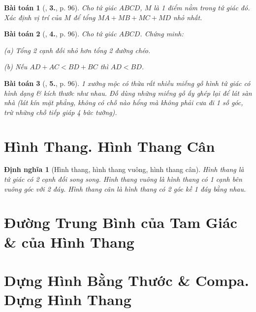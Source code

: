 \documentclass{article}
\numberwithin{equation}{section}
\newtheorem{dinhnghia}{Định nghĩa}[section]
\newtheorem{baitoan}{Bài toán}[section]
\begin{document}
\begin{baitoan}[\cite{Tuyen_Toan_8}, \textbf{3.}, p. 96]
	Cho tứ giác $ABCD$, $M$ là 1 điểm nằm trong tứ giác đó. Xác định vị trí của $M$ để tổng $MA + MB + MC + MD$ nhỏ nhất.
\end{baitoan}

\begin{baitoan}[\cite{Tuyen_Toan_8}, \textbf{4.}, p. 96]
	Cho tứ giác $ABCD$. Chứng minh:
	\begin{enumerate*}
		\item[(a)] Tổng 2 cạnh đối nhỏ hơn tổng 2 đường chéo.
		\item[(b)] Nếu $AD + AC < BD + BC$ thì $AD < BD$.
	\end{enumerate*}
\end{baitoan}

\begin{baitoan}[\cite{Tuyen_Toan_8}, \textbf{5.}, p. 96]
	1 xưởng mộc có thừa rất nhiều miếng gỗ hình tứ giác có hình dạng \& kích thước như nhau. Đố dùng những miếng gỗ ấy ghép lại để lát sàn nhà (lát kín mặt phẳng, không có chỗ nào hổng mà không phải cưa đi 1 số góc, trừ những chỗ tiếp giáp 4 bức tường).
\end{baitoan}


\section{Hình Thang. Hình Thang Cân}

\begin{dinhnghia}[Hình thang, hình thang vuông, hình thang cân]
	\emph{Hình thang} là tứ giác có 2 cạnh đối song song. \emph{Hình thang vuông} là hình thang có 1 cạnh bên vuông góc với 2 đáy. \emph{Hình thang cân} là hình thang có 2 góc kề 1 đáy bằng nhau.
\end{dinhnghia}


\section{Đường Trung Bình của Tam Giác \& của Hình Thang}


\section{Dựng Hình Bằng Thước \& Compa. Dựng Hình Thang}
\end{document}
